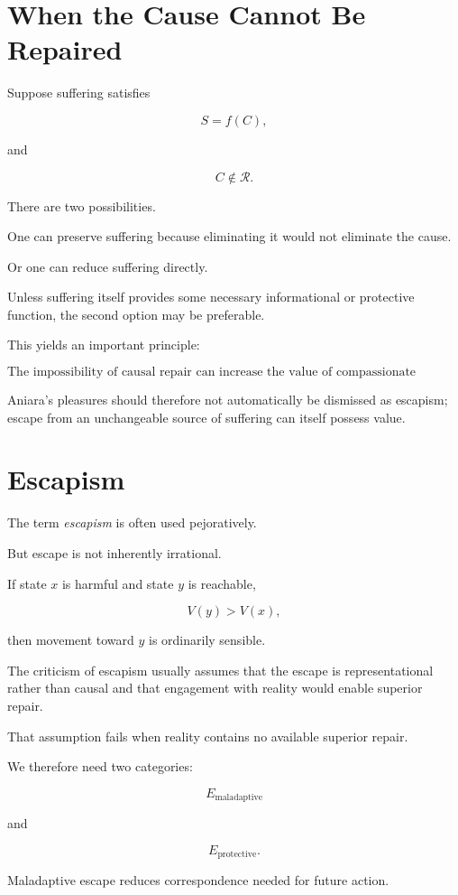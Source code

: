 \documentclass[11pt,oneside]{book}
\theoremstyle{definition}
\theoremstyle{remark}
\newcommand{\R}{\mathcal{R}}
\begin{document}
\section{When the Cause Cannot Be Repaired}

Suppose suffering satisfies

\[
S=f(C),
\]

and

\[
C\notin\R.
\]

There are two possibilities.

One can preserve suffering because eliminating it would not eliminate the cause.

Or one can reduce suffering directly.

Unless suffering itself provides some necessary informational or protective function, the second option may be preferable.

This yields an important principle:

\[
\boxed{
\text{The impossibility of causal repair can increase the value of compassionate symptomatic repair.}
}
\]

Aniara's pleasures should therefore not automatically be dismissed as escapism; escape from an unchangeable source of suffering can itself possess value.

\section{Escapism}

The term \emph{escapism} is often used pejoratively.

But escape is not inherently irrational.

If state \(x\) is harmful and state \(y\) is reachable,

\[
V(y)>V(x),
\]

then movement toward \(y\) is ordinarily sensible.

The criticism of escapism usually assumes that the escape is representational rather than causal and that engagement with reality would enable superior repair.

That assumption fails when reality contains no available superior repair.

We therefore need two categories:

\[
E_{\mathrm{maladaptive}}
\]

and

\[
E_{\mathrm{protective}}.
\]

Maladaptive escape reduces correspondence needed for future action.
\end{document}
